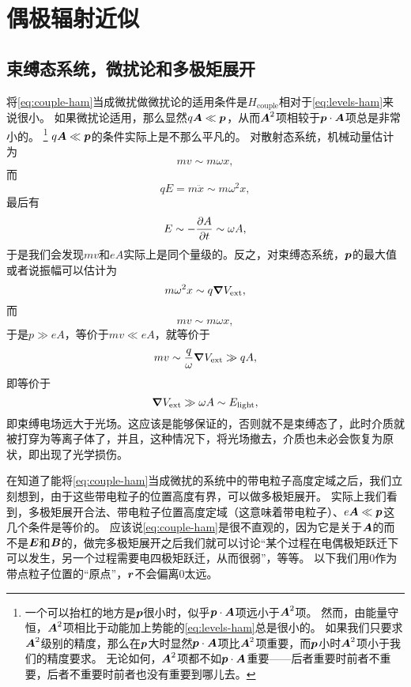 \section{偶极辐射近似}

\subsection{束缚态系统，微扰论和多极矩展开}\label{sec:multipole}

将\eqref{eq:couple-ham}当成微扰做微扰论的适用条件是$H_\text{couple}$相对于\eqref{eq:levels-ham}来说很小。
如果微扰论适用，那么显然$q \vb*{A} \ll \vb*{p}$，从而$\vb*{A}^2$项相较于$\vb*{p} \cdot \vb*{A}$项总是非常小的。%
\footnote{
    一个可以抬杠的地方是$\vb*{p}$很小时，似乎$\vb*{p} \cdot \vb*{A}$项远小于$\vb*{A}^2$项。
    然而，由能量守恒，$\vb*{A}^2$项相比于动能加上势能的\eqref{eq:levels-ham}总是很小的。
    如果我们只要求$\vb*{A}^2$级别的精度，那么在$\vb*{p}$大时显然$\vb*{p} \cdot \vb*{A}$项比$\vb*{A}^2$项重要，而$\vb*{p}$小时$\vb*{A}^2$项小于我们的精度要求。
    无论如何，$\vb*{A}^2$项都不如$\vb*{p} \cdot \vb*{A}$重要——后者重要时前者不重要，后者不重要时前者也没有重要到哪儿去。
}%
$q \vb*{A} \ll \vb*{p}$的条件实际上是不那么平凡的。
对散射态系统，机械动量估计为
\[
    m v \sim m \omega x,
\]
而
\[
    q E = m \ddot{x} \sim m \omega^2 x,
\]
最后有
\[
    E \sim - \pdv{A}{t} \sim \omega A,
\]
于是我们会发现$mv$和$eA$实际上是同个量级的。反之，对束缚态系统，$\vb*{p}$的最大值或者说振幅可以估计为
\[
    m \omega^2 x \sim q \grad{V_\text{ext}},
\]
而
\[
    mv \sim m \omega x,
\]
于是$p \gg eA$，等价于$mv \ll eA$，就等价于
\[
    mv \sim \frac{q}{\omega} \grad{V_\text{ext}} \gg q A,
\]
即等价于
\begin{equation}
    \grad{V_\text{ext}} \gg \omega A \sim E_\text{light},
\end{equation}
即束缚电场远大于光场。这应该是能够保证的，否则就不是束缚态了，此时介质就被打穿为等离子体了，并且，这种情况下，将光场撤去，介质也未必会恢复为原状，即出现了光学损伤。

在知道了能将\eqref{eq:couple-ham}当成微扰的系统中的带电粒子高度定域之后，我们立刻想到，由于这些带电粒子的位置高度有界，可以做多极矩展开。
实际上我们看到，多极矩展开合法、带电粒子位置高度定域（这意味着带电粒子）、$e \vb*{A} \ll \vb*{p}$这几个条件是等价的。
应该说\eqref{eq:couple-ham}是很不直观的，因为它是关于$\vb*{A}$的而不是$\vb*{E}$和$\vb*{B}$的，做完多极矩展开之后我们就可以讨论“某个过程在电偶极矩跃迁下可以发生，另一个过程需要电四极矩跃迁，从而很弱”，等等。
以下我们用$0$作为带点粒子位置的“原点”，$\vb*{r}$不会偏离$0$太远。

